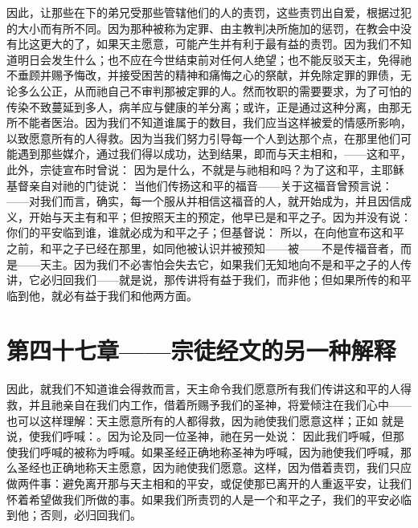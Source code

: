 因此，让那些在下的弟兄受那些管辖他们的人的责罚，这些责罚出自爱，根据过犯的大小而有所不同。因为那种被称为定罪、由主教判决所施加的惩罚，在教会中没有比这更大的了，如果天主愿意，可能产生并有利于最有益的责罚。因为我们不知道明日会发生什么；也不应在今世结束前对任何人绝望；也不能反驳天主，免得祂不垂顾并赐予悔改，并接受困苦的精神和痛悔之心的祭献，并免除定罪的罪债，无论多么公正，从而祂自己不审判那被定罪的人。然而牧职的需要要求，为了可怕的传染不致蔓延到多人，病羊应与健康的羊分离；或许，正是通过这种分离，由那无所不能者医治。因为我们不知道谁属于的数目，我们应当这样被爱的情感所影响，以致愿意所有的人得救。因为当我们努力引导每一个人到达那个点，在那里他们可能遇到那些媒介，通过我们得以成功，达到结果，即而与天主相和，——这和平，此外，宗徒宣布时曾说： 因为是什么，不就是与祂相和吗？为了这和平，主耶稣基督亲自对祂的门徒说： 当他们传扬这和平的福音——关于这福音曾预言说：——对我们而言，确实，每一个服从并相信这福音的人，就开始成为，并且因信成义，开始与天主有和平；但按照天主的预定，他早已是和平之子。因为并没有说：你们的平安临到谁，谁就必成为和平之子；但基督说： 所以，在向他宣布这和平之前，和平之子已经在那里，如同他被认识并被预知——被——不是传福音者，而是——天主。因为我们不必害怕会失去它，如果我们无知地向不是和平之子的人传讲，它必归回我们——就是说，那传讲将有益于我们，而非他；但如果所传的和平临到他，就必有益于我们和他两方面。\par


\section{第四十七章——宗徒经文的另一种解释}

因此，就我们不知道谁会得救而言，天主命令我们愿意所有我们传讲这和平的人得救，并且祂亲自在我们内工作，借着所赐予我们的圣神，将爱倾注在我们心中——也可以这样理解：天主愿意所有的人都得救，因为祂使我们愿意这样；正如 就是说，使我们呼喊：。因为论及同一位圣神，祂在另一处说： 因此我们呼喊，但那使我们呼喊的被称为呼喊。如果圣经正确地称圣神为呼喊，因为祂使我们呼喊，那么圣经也正确地称天主愿意，因为祂使我们愿意。这样，因为借着责罚，我们只应做两件事：避免离开那与天主相和的平安，或促使那已离开的人重返平安，让我们怀着希望做我们所做的事。如果我们所责罚的人是一个和平之子，我们的平安必临到他；否则，必归回我们。\par

